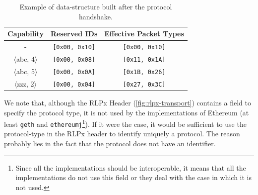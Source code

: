 \begin{table}
  \begin{center}
    \begin{tabular}{c | c | c }
      Capability & Reserved IDs & Effective Packet Types\\
      \hline
      - & \texttt{[0x00, 0x10]} & \texttt{[0x00, 0x10]} \\
      $\langle$abc, 4$\rangle$ & \texttt{[0x00, 0x08]} & \texttt{[0x11, 0x1A]}
      \\
      $\langle$abc, 5$\rangle$ & \texttt{[0x00, 0x0A]} & \texttt{[0x1B, 0x26]}
      \\
      $\langle$zzz, 2$\rangle$ & \texttt{[0x00, 0x04]} & \texttt{[0x27, 0x3C]}
      \\
    \end{tabular}
    \caption{Example of data-structure built after the protocol handshake.}
    \label{table:capabilities}
  \end{center}
\end{table}

We note that, although the RLPx Header (\autoref{fig:rlpx-transport}) contains a
field to specify the protocol type, it is not used by the implementations of
Ethereum (at least \texttt{geth} and \texttt{ethereumj}\footnote{Since all the
implementations should be interoperable, it means that all the implementations
do not use this field or they deal with the case in which it is not used.}). If
it were the case, it would be sufficient to use the protocol-type in the RLPx
header to identify uniquely a protocol. The reason probably lies in the fact
that the \devpp{} protocol does not have an identifier.
